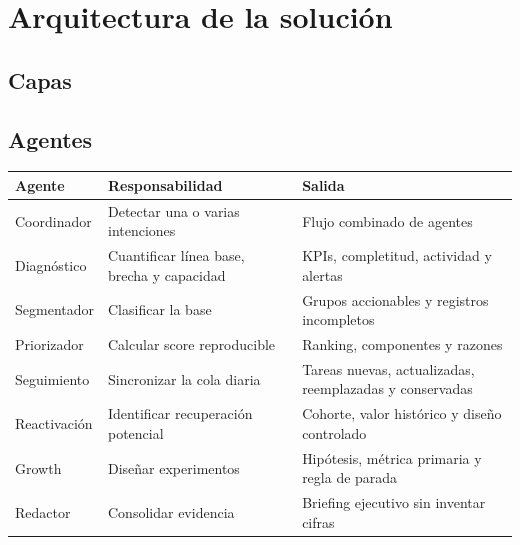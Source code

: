 \documentclass[11pt,a4paper]{article}
\begin{document}
\section{Arquitectura de la solución}

\subsection{Capas}

\begin{center}
\end{center}

\subsection{Agentes}

\begin{longtable}{p{2.8cm}p{5cm}p{6.8cm}}
\toprule
\textbf{Agente} & \textbf{Responsabilidad} & \textbf{Salida}\\
\midrule
\endhead
Coordinador & Detectar una o varias intenciones & Flujo combinado de agentes\\
Diagnóstico & Cuantificar línea base, brecha y capacidad & KPIs, completitud,
actividad y alertas\\
Segmentador & Clasificar la base & Grupos accionables y registros incompletos\\
Priorizador & Calcular score reproducible & Ranking, componentes y razones\\
Seguimiento & Sincronizar la cola diaria & Tareas nuevas, actualizadas,
reemplazadas y conservadas\\
Reactivación & Identificar recuperación potencial & Cohorte, valor histórico y
diseño controlado\\
Growth & Diseñar experimentos & Hipótesis, métrica primaria y regla de parada\\
Redactor & Consolidar evidencia & Briefing ejecutivo sin inventar cifras\\
\bottomrule
\end{longtable}
\end{document}
